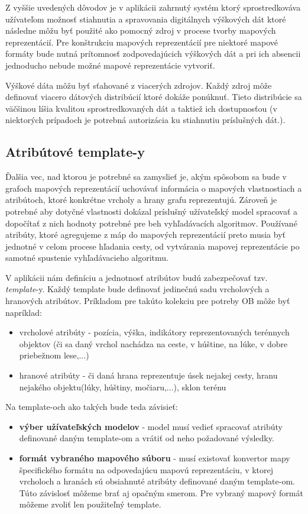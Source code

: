 Z vyššie uvedených dôvodov je v aplikácii zahrnutý systém ktorý sprostredkováva užívateľom možnosť stiahnutia a spravovania digitálnych výškových dát ktoré následne môžu byť použité ako pomocný zdroj v procese tvorby mapových reprezentácií. Pre konštrukciu mapových reprezentácií pre niektoré mapové formáty bude nutná prítomnosť zodpovedajúcich výškových dát a pri ich absencii jednoducho nebude možné mapové reprezentácie vytvoriť.

Výškové dáta môžu byť sťahované z viacerých zdrojov. Každý zdroj môže definovať viacero dátových distribúcií ktoré dokáže ponúknuť. Tieto distribúcie sa väčšinou líšia kvalitou sprostredkovaných dát a taktiež ich dostupnosťou (v niektorých prípadoch je potrebná autorizácia ku stiahnutiu príslušných dát.).


\subsection{Atribútové template-y}\label{templatey}

Ďalšia vec, nad ktorou je potrebné sa zamyslieť je, akým spôsobom sa bude v grafoch mapových reprezentácií uchovávať informácia o mapových vlastnostiach a atribútoch, ktoré konkrétne vrcholy a hrany grafu reprezentujú. Zároveň je potrebné aby dotyčné vlastnosti dokázal príslušný užívateľský model spracovať a dopočítať z nich hodnoty potrebné pre beh vyhľadávacích algoritmov. Používané atribúty, ktoré agregujeme z máp do mapových reprezentácií preto musia byť jednotné v celom procese hľadania cesty, od vytvárania mapovej reprezentácie po samotné spustenie vyhľadávacieho algoritmu.

V aplikácii nám definíciu a jednotnosť atribútov budú zabezpečovať tzv. \textit{template}-y. Každý template bude definovať jedinečnú sadu vrcholových a hranových atribútov. Príkladom pre takúto kolekciu pre potreby OB môže byť napríklad:
\begin{itemize}
    \item vrcholové atribúty - pozícia, výška, indikátory reprezentovaných terénnych objektov (či sa daný vrchol nachádza na ceste, v húštine, na lúke, v dobre priebežnom lese,...)
    \item hranové atribúty - či daná hrana reprezentuje úsek nejakej cesty, hranu nejakého objektu(lúky, húštiny, močiaru,...), sklon terénu
\end{itemize}

Na template-och ako takých bude teda závisieť: 
\begin{itemize}
    \item \textbf{výber užívateľských modelov} - model musí vedieť spracovať atribúty definované daným template-om a vrátiť od neho požadované výsledky.
    \item \textbf{formát vybraného mapového súboru} - musí existovať konvertor mapy špecifického formátu na odpovedajúcu mapovú reprezentáciu, v ktorej vrcholoch a hranách sú obsiahnuté atribúty definované daným template-om. Túto závislosť môžeme brať aj opačným smerom. Pre vybraný mapový formát môžeme zvoliť len použiteľný template.
\end{itemize}


